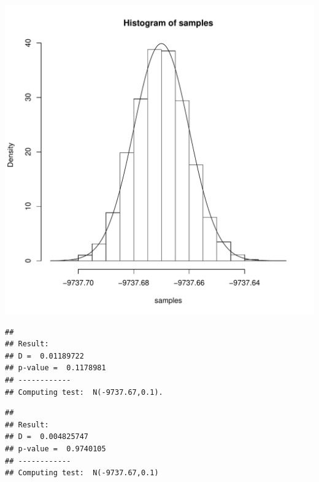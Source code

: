 \documentclass{llncs}\usepackage[]{graphicx}\usepackage[]{color}
\makeatletter
\def\maxwidth{ %
  \ifdim\Gin@nat@width>\linewidth
    \linewidth
  \else
    \Gin@nat@width
  \fi
}
\newenvironment{kframe}{%
 \def\at@end@of@kframe{}%
 \ifinner\ifhmode%
  \def\at@end@of@kframe{\end{minipage}}%
  \begin{minipage}{\columnwidth}%
 \fi\fi%
 \def\FrameCommand##1{\hskip\@totalleftmargin \hskip-\fboxsep
 \colorbox{shadecolor}{##1}\hskip-\fboxsep
     \hskip-\linewidth \hskip-\@totalleftmargin \hskip\columnwidth}%
 \MakeFramed {\advance\hsize-\width
   \@totalleftmargin\z@ \linewidth\hsize
   \@setminipage}}%
 {\par\unskip\endMakeFramed%
 \at@end@of@kframe}
\newenvironment{knitrout}{}{} %
\makeatother
\begin{document}
\begin{knitrout}
\includegraphics[width=\maxwidth]{figure/Rt-22} 
\begin{kframe}\begin{lstlisting}[basicstyle=\ttfamily,breaklines=true]
## 
## Result:
## D =  0.01189722 
## p-value =  0.1178981 
## ------------
## Computing test:  N(-9737.67,0.1).
\end{lstlisting}
\begin{lstlisting}[basicstyle=\ttfamily,breaklines=true]
## 
## Result:
## D =  0.004825747 
## p-value =  0.9740105 
## ------------
## Computing test:  N(-9737.67,0.1)
\end{lstlisting}



\end{kframe}
\end{knitrout}
\end{document}
